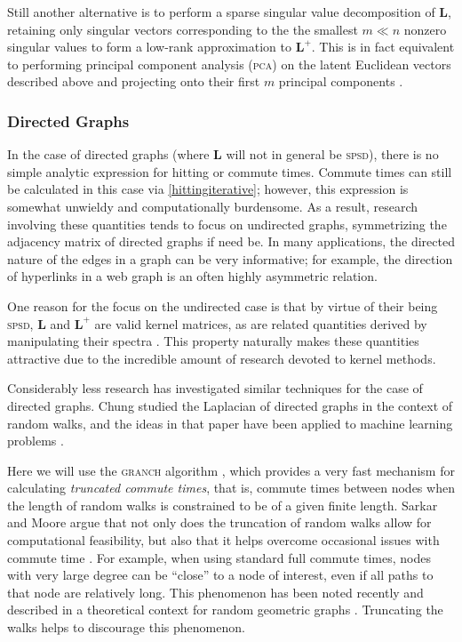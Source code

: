 \documentclass{acm_proc_article-sp}
\newcommand{\bm}[1]{\mathbf{#1}}
\begin{document}
Still another alternative is to perform a sparse singular value
decomposition of $\bm{L}$, retaining only singular vectors
corresponding to the the smallest $m \ll n$ nonzero singular values to
form a low-rank approximation to $\bm{L}^+$.  This is in fact
equivalent to performing principal component analysis (\textsc{pca})
on the latent Euclidean vectors described above and projecting onto
their first $m$ principal components \citep{fouss}.

\subsubsection{Directed Graphs}

In the case of directed graphs (where $\bm{L}$ will not in general be
\textsc{spsd}), there is no simple analytic expression for hitting or
commute times.  Commute times can still be calculated in this case via
\eqref{hittingiterative}; however, this expression is somewhat
unwieldy and computationally burdensome.  As a result, research
involving these quantities tends to focus on undirected graphs,
symmetrizing the adjacency matrix of directed graphs if need be.  In
many applications, the directed nature of the edges in a graph can be
very informative; for example, the direction of hyperlinks in a web
graph is an often highly asymmetric relation.

One reason for the focus on the undirected case is that by virtue of
their being \textsc{spsd}, $\bm{L}$ and $\bm{L}^+$ are valid kernel
matrices, as are related quantities derived by manipulating their
spectra \citep{zhuspectrum}.  This property naturally makes these
quantities attractive due to the incredible amount of research devoted
to kernel methods.

Considerably less research has investigated similar techniques for the
case of directed graphs.  Chung \citep{chung} studied the Laplacian of
directed graphs in the context of random walks, and the ideas in that
paper have been applied to machine learning problems \citep{zhou}.

Here we will use the \textsc{granch} algorithm \citep{granch,
  granchfast}, which provides a very fast mechanism for calculating
\emph{truncated commute times}, that is, commute times between nodes
when the length of random walks is constrained to be of a given finite
length.  Sarkar and Moore argue that not only does the truncation of
random walks allow for computational feasibility, but also that it
helps overcome occasional issues with commute time \citep{granch}.
For example, when using standard full commute times, nodes with very
large degree can be ``close'' to a node of interest, even if all paths
to that node are relatively long.  This phenomenon has been noted
recently and described in a theoretical context for random geometric
graphs \citep{commutetimedegree}.  Truncating the walks helps to
discourage this phenomenon.
\end{document}
